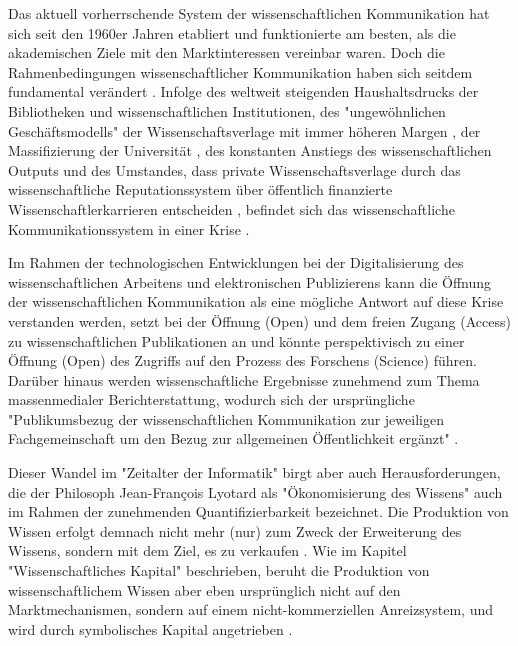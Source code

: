 Das aktuell vorherrschende System der wissenschaftlichen Kommunikation hat sich seit den 1960er Jahren etabliert und funktionierte am besten, als die akademischen Ziele mit den Marktinteressen vereinbar waren. Doch die Rahmenbedingungen wissenschaftlicher Kommunikation haben sich seitdem fundamental verändert \cite{epaa_Weiner_2001}. Infolge des weltweit steigenden Haushaltsdrucks der Bibliotheken und wissenschaftlichen Institutionen, des "ungewöhnlichen Geschäftsmodells" \cite{cite:12} der Wissenschaftsverlage mit immer höheren Margen \cite{albert_2006_open_implications}, der Massifizierung der Universität \cite{binswanger_2014_excellence}, des konstanten Anstiegs des wissenschaftlichen Outputs \cite[:23]{haustein_2012_multidimensional} und des Umstandes, dass private Wissenschaftsverlage durch das wissenschaftliche Reputationssystem über öffentlich finanzierte Wissenschaftlerkarrieren entscheiden \cite{heise_2012}, befindet sich das wissenschaftliche Kommunikationssystem in einer Krise \cite{cite:14}.

Im Rahmen der technologischen Entwicklungen bei der Digitalisierung des wissenschaftlichen Arbeitens und elektronischen Publizierens kann die Öffnung der wissenschaftlichen Kommunikation als eine mögliche Antwort auf diese Krise verstanden werden, setzt bei der Öffnung (Open) und dem freien Zugang (Access) zu wissenschaftlichen Publikationen an und könnte perspektivisch zu einer Öffnung (Open) des Zugriffs auf den Prozess des Forschens (Science) führen. Darüber hinaus werden wissenschaftliche Ergebnisse zunehmend zum Thema massenmedialer Berichterstattung, wodurch sich der ursprüngliche "Publikumsbezug der wissenschaftlichen Kommunikation zur jeweiligen Fachgemeinschaft um den Bezug zur allgemeinen Öffentlichkeit ergänzt" \cite{bbaw_publizieren_2015}.

Dieser Wandel im "Zeitalter der Informatik" birgt aber auch Herausforderungen, die der Philosoph Jean-François Lyotard als "Ökonomisierung des Wissens" \cite{lyotard_1993_postmoderne} auch im Rahmen der zunehmenden Quantifizierbarkeit bezeichnet. Die Produktion von Wissen erfolgt demnach nicht mehr (nur) zum Zweck der Erweiterung des Wissens, sondern mit dem Ziel, es zu verkaufen \cite[:156]{troy_2012_wissen}. Wie im Kapitel "Wissenschaftliches Kapital" beschrieben, beruht die Produktion von wissenschaftlichem Wissen aber eben ursprünglich nicht auf den Marktmechanismen, sondern auf einem nicht-kommerziellen Anreizsystem, und wird durch symbolisches Kapital angetrieben \cite[:157]{troy_2012_wissen}.

